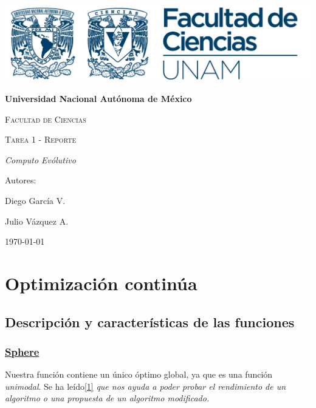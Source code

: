 \documentclass{article}
\begin{document}
\begin{titlepage}
{\includegraphics[width=1\textwidth]{./img/logoFC.png}\par}
\vspace{1cm}
\centering
{\bfseries\huge Universidad Nacional Autónoma de México \par}
\vspace{1cm}
{\scshape\huge Facultad de Ciencias \par}
\vspace{2cm}
{\scshape\Huge Tarea 1 - Reporte\par}
\vspace{2cm}
{\itshape\LARGE Computo Evólutivo \par}
\vfill
{\large Autores: \par}
{\large Diego García V. \par}
{\large Julio Vázquez A. \par}
\vfill
{\Large \today \par}
\end{titlepage}

\section*{Optimización continúa}

\subsection*{Descripción y características de las funciones}

\subsubsection*{\href{https://www.sfu.ca/~ssurjano/spheref.html}{Sphere}}
Nuestra función contiene un único óptimo global, ya que es una función \textit{unimodal}.
Se ha leído\href{https://xloptimizer.com/projects/toy-problems/sphere-function-pure-excel#:~:text=The\%20sphere\%20function\%20is\%20one,proposed\%20modification\%20of\%20an\%20algorithm.)}{[1]} \textit{que nos ayuda a poder probar el rendimiento de un algoritmo o una propuesta de un algoritmo
modificado.}
\end{document}
